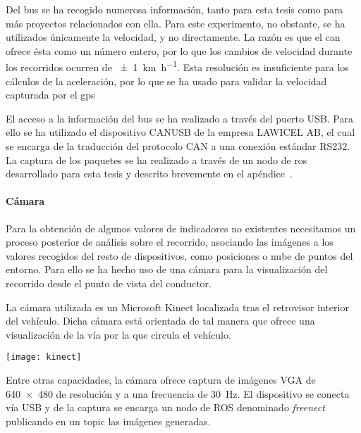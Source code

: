 Del bus se ha recogido numerosa información, tanto para esta tesis como para más proyectos relacionados con ella. Para este experimento, no obstante, se ha utilizados únicamente la velocidad, y no directamente. La razón es que el \ac{can} ofrece ésta como un número entero, por lo que los cambios de velocidad durante los recorridos ocurren de \SI{\pm1}{\km\per\hour}. Esta resolución es insuficiente para los cálculos de la aceleración, por lo que se ha usado para validar la velocidad capturada por el \ac{gps}

El acceso a la información del bus se ha realizado a través del puerto USB. Para ello se ha utilizado el dispositivo CANUSB de la empresa LAWICEL AB, el cual se encarga de la traducción del protocolo CAN a una conexión estándar RS232. La captura de los paquetes se ha realizado a través de un nodo de \ac{ros} desarrollado para esta tesis y descrito brevemente en el apéndice~.

\paragraph{Cámara}

Para la obtención de algunos valores de indicadores no existentes necesitamos un proceso posterior de análisis sobre el recorrido, asociando las imágenes a los valores recogidos del resto de dispositivos, como posiciones o nube de puntos del entorno. Para ello se ha hecho uso de una cámara para la visualización del recorrido desde el punto de vista del conductor.

La cámara utilizada es un Microsoft Kinect localizada tras el retrovisor interior del vehículo. Dicha cámara está orientada de tal manera que ofrece una visualización de la vía por la que circula el vehículo.

\begin{marginfigure}
	\centering
	\texttt{[image: kinect]}
	\caption{La cámara Kinect desarrollada por Microsoft ofrece imágenes a color a una velocidad de \SI{30}{\fps} con una resolución de \SI{640x480}{\px}.}
	\label{fig:kinect}
\end{marginfigure}

Entre otras capacidades, la cámara ofrece captura de imágenes VGA de \SI{640x480}{\px} de resolución y a una frecuencia de \SI{30}{\Hz}. El dispositivo se conecta vía USB y de la captura se encarga un nodo de ROS denominado \textit{freenect} publicando en un topic las imágenes generadas.

